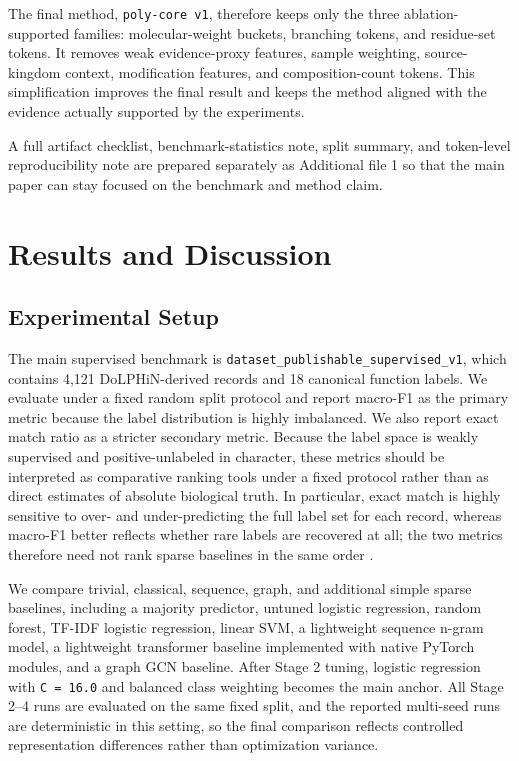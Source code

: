 \documentclass{article}
\begin{document}
The final method, \texttt{poly-core v1}, therefore keeps only the three ablation-supported families: molecular-weight buckets, branching tokens, and residue-set tokens. It removes weak evidence-proxy features, sample weighting, source-kingdom context, modification features, and composition-count tokens. This simplification improves the final result and keeps the method aligned with the evidence actually supported by the experiments.

A full artifact checklist, benchmark-statistics note, split summary, and token-level reproducibility note are prepared separately as Additional file 1 so that the main paper can stay focused on the benchmark and method claim.

\section{Results and Discussion}
\label{sec:exp}

\subsection{Experimental Setup}

The main supervised benchmark is \texttt{dataset\_publishable\_supervised\_v1}, which contains 4,121 DoLPHiN-derived records and 18 canonical function labels. We evaluate under a fixed random split protocol and report macro-F1 as the primary metric because the label distribution is highly imbalanced. We also report exact match ratio as a stricter secondary metric. Because the label space is weakly supervised and positive-unlabeled in character, these metrics should be interpreted as comparative ranking tools under a fixed protocol rather than as direct estimates of absolute biological truth. In particular, exact match is highly sensitive to over- and under-predicting the full label set for each record, whereas macro-F1 better reflects whether rare labels are recovered at all; the two metrics therefore need not rank sparse baselines in the same order \cite{pillai2017fmeasure}.

We compare trivial, classical, sequence, graph, and additional simple sparse baselines, including a majority predictor, untuned logistic regression, random forest, TF-IDF logistic regression, linear SVM, a lightweight sequence n-gram model, a lightweight transformer baseline implemented with native PyTorch modules, and a graph GCN baseline. After Stage 2 tuning, logistic regression with \texttt{C = 16.0} and balanced class weighting becomes the main anchor. All Stage 2--4 runs are evaluated on the same fixed split, and the reported multi-seed runs are deterministic in this setting, so the final comparison reflects controlled representation differences rather than optimization variance.
\end{document}

